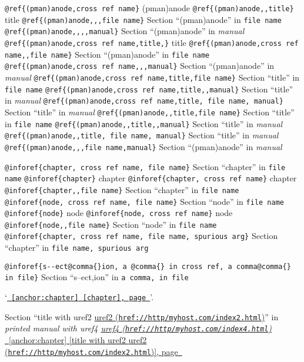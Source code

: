 \documentclass{book}
\begin{document}
\begin{titlepage}
\texttt{@ref\{(pman)anode,cross ref name\}} (pman)anode
\texttt{@ref\{(pman)anode{,}{,}title\}} title
\texttt{@ref\{(pman)anode{,}{,},file name\}} Section ``(pman)anode'' in \texttt{file name}
\texttt{@ref\{(pman)anode{,}{,}{,}{,}manual\}} Section ``(pman)anode'' in \textsl{manual}
\texttt{@ref\{(pman)anode,cross ref name,title,\}} title
\texttt{@ref\{(pman)anode,cross ref name{,}{,}file name\}} Section ``(pman)anode'' in \texttt{file name}
\texttt{@ref\{(pman)anode,cross ref name{,}{,},manual\}} Section ``(pman)anode'' in \textsl{manual}
\texttt{@ref\{(pman)anode,cross ref name,title,file name\}} Section ``title'' in \texttt{file name}
\texttt{@ref\{(pman)anode,cross ref name,title{,}{,}manual\}} Section ``title'' in \textsl{manual}
\texttt{@ref\{(pman)anode,cross ref name,title,\ file name,\ manual\}} Section ``title'' in \textsl{manual}
\texttt{@ref\{(pman)anode{,}{,}title,file name\}} Section ``title'' in \texttt{file name}
\texttt{@ref\{(pman)anode{,}{,}title{,}{,}manual\}} Section ``title'' in \textsl{manual}
\texttt{@ref\{(pman)anode{,}{,}title,\ file name,\ manual\}} Section ``title'' in \textsl{manual}
\texttt{@ref\{(pman)anode{,}{,},file name,manual\}} Section ``(pman)anode'' in \textsl{manual}


\texttt{@inforef\{chapter,\ cross ref name,\ file name\}} Section ``chapter'' in \texttt{file name}
\texttt{@inforef\{chapter\}} chapter
\texttt{@inforef\{chapter,\ cross ref name\}} chapter
\texttt{@inforef\{chapter{,}{,}file name\}} Section ``chapter'' in \texttt{file name}
\texttt{@inforef\{node,\ cross ref name,\ file name\}} Section ``node'' in \texttt{file name}
\texttt{@inforef\{node\}} node
\texttt{@inforef\{node,\ cross ref name\}} node
\texttt{@inforef\{node{,}{,}file name\}} Section ``node'' in \texttt{file name}
\texttt{@inforef\{chapter,\ cross ref name,\ file name,\ spurious arg\}} Section ``chapter'' in \texttt{file name,\ spurious arg}

\texttt{@inforef\{s{-}{-}ect@comma\{\}ion,\ a @comma\{\} in cross
ref,\ a comma@comma\{\} in file\}}
Section ``s--ect,ion'' in \texttt{a comma, in file}

`\texttt{\hyperref[anchor:chapter]{\chaptername~\ref*{anchor:chapter} [chapter], page~\pageref*{anchor:chapter}}}'.

Section ``title with uref2 \href{href://http/myhost.com/index2.html}{uref2 (\nolinkurl{href://http/myhost.com/index2.html})}'' in \textsl{printed manual with uref4 \href{href://http/myhost.com/index4.html}{uref4 (\nolinkurl{href://http/myhost.com/index4.html})}}
\hyperref[anchor:chapter]{\chaptername~\ref*{anchor:chapter} [title with uref2 \href{href://http/myhost.com/index2.html}{uref2 (\nolinkurl{href://http/myhost.com/index2.html})}], page~\pageref*{anchor:chapter}}


\end{titlepage}
\end{document}

